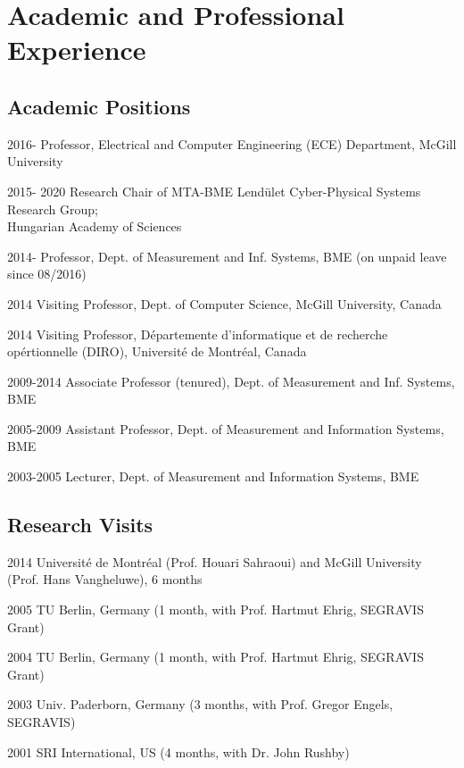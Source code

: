 \section{Academic and Professional Experience}
\subsection{Academic Positions}
\begin{yearlist}
\item[2016-] Professor, Electrical and Computer Engineering (ECE) Department, McGill University
\item[2015- 2020] Research Chair of MTA-BME Lendület Cyber-Physical Systems Research Group; \\ Hungarian Academy of Sciences 
\item[2014-] Professor, Dept. of Measurement and Inf. Systems, BME  (on unpaid leave since 08/2016)
\item[2014] Visiting Professor, Dept. of Computer Science, McGill University, Canada
\item[2014] Visiting Professor, D\'epartemente d'informatique et de recherche op\'ertionnelle (DIRO), Universit\'e de Montr\'eal, Canada
\item[2009-2014] Associate Professor (tenured), Dept. of Measurement and Inf. Systems, BME 	
\item[2005-2009] Assistant Professor, Dept. of Measurement and Information Systems, BME 
\item[2003-2005] Lecturer, Dept. of Measurement and Information Systems, BME
\end{yearlist}

\subsection{Research Visits} 
\begin{yearlist}
\item[2014] Universit\'e de Montr\'eal (Prof. Houari Sahraoui) and McGill University (Prof. Hans Vangheluwe),  6 months
\item[2005] TU Berlin, Germany (1 month, with Prof. Hartmut Ehrig, SEGRAVIS Grant)
\item[2004] TU Berlin, Germany (1 month, with Prof. Hartmut Ehrig, SEGRAVIS Grant)
\item[2003] Univ. Paderborn, Germany (3 months, with Prof. Gregor Engels, SEGRAVIS) 
\item[2001] SRI International, US (4 months, with Dr. John Rushby) 
\end{yearlist}

